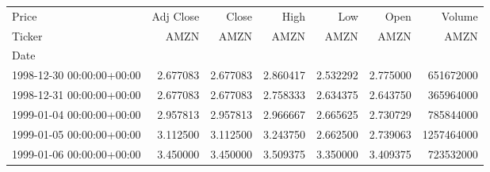 \begin{tabular}{lrrrrrr}
\toprule
Price & Adj Close & Close & High & Low & Open & Volume \\
Ticker & AMZN & AMZN & AMZN & AMZN & AMZN & AMZN \\
Date &  &  &  &  &  &  \\
\midrule
1998-12-30 00:00:00+00:00 & 2.677083 & 2.677083 & 2.860417 & 2.532292 & 2.775000 & 651672000 \\
1998-12-31 00:00:00+00:00 & 2.677083 & 2.677083 & 2.758333 & 2.634375 & 2.643750 & 365964000 \\
1999-01-04 00:00:00+00:00 & 2.957813 & 2.957813 & 2.966667 & 2.665625 & 2.730729 & 785844000 \\
1999-01-05 00:00:00+00:00 & 3.112500 & 3.112500 & 3.243750 & 2.662500 & 2.739063 & 1257464000 \\
1999-01-06 00:00:00+00:00 & 3.450000 & 3.450000 & 3.509375 & 3.350000 & 3.409375 & 723532000 \\
\bottomrule
\end{tabular}
